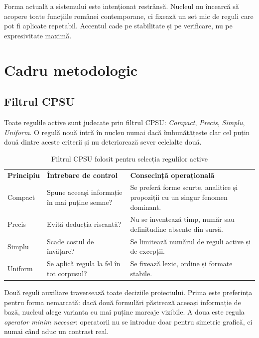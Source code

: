 \documentclass[12pt,onecolumn,letterpaper]{article}
\newcommand{\RStablelayout}{%
\footnotesize
\setlength{\tabcolsep}{6pt}%
\renewcommand{\arraystretch}{1.12}%
\arrayrulecolor{RSRule}%
}
\begin{document}
Forma actuală a sistemului este intenționat restrânsă. Nucleul nu încearcă să
acopere toate funcțiile românei contemporane, ci fixează un set mic de reguli
care pot fi aplicate repetabil. Accentul cade pe stabilitate și pe verificare,
nu pe expresivitate maximă.

\section{Cadru metodologic}

\subsection{Filtrul CPSU}

Toate regulile active sunt judecate prin filtrul CPSU: \textit{Compact},
\textit{Precis}, \textit{Simplu}, \textit{Uniform}. O regulă nouă intră în
nucleu numai dacă îmbunătățește clar cel puțin două dintre aceste criterii și nu
deteriorează sever celelalte două.

\begin{table}[h!]
\centering
\RStablelayout
\begin{tabularx}{\linewidth}{@{}lYY@{}}
\textbf{Principiu} & \textbf{Întrebare de control} & \textbf{Consecință operațională} \\
Compact & Spune aceeași informație în mai puține semne? & Se preferă forme scurte, analitice și propoziții cu un singur fenomen dominant. \\
Precis & Evită deducția riscantă? & Nu se inventează timp, număr sau definitudine absente din sursă. \\
Simplu & Scade costul de învățare? & Se limitează numărul de reguli active și de excepții. \\
Uniform & Se aplică regula la fel în tot corpusul? & Se fixează lexic, ordine și formate stabile. \\
\bottomrule
\end{tabularx}
\caption{Filtrul CPSU folosit pentru selecția regulilor active}
\end{table}

Două reguli auxiliare traversează toate deciziile proiectului. Prima este
preferința pentru forma nemarcată: dacă două formulări păstrează aceeași
informație de bază, nucleul alege varianta cu mai puține marcaje vizibile. A
doua este regula \textit{operator minim necesar}: operatorii nu se introduc doar
pentru simetrie grafică, ci numai când aduc un contrast real.
\end{document}
